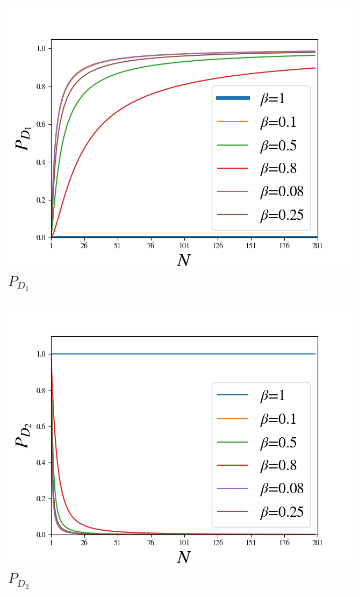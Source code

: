 \documentclass{book}
\begin{document}
 \begin{figure}[!t]
\centering
\begin{subfigure}[b]{0.45\linewidth}
\includegraphics[width=\linewidth]{images/ChopperD1.png}
\caption{$P_{D_{1}}$}
\label{fig:BS1}
\end{subfigure}
\begin{subfigure}[b]{0.45\linewidth}
\includegraphics[width=\linewidth]{images/ChopperD2.png}
\caption{$P_{D_{2}}$}
\label{fig:westminster_aerea}
\end{subfigure}
\begin{subfigure}[b]{0.45\linewidth}

\end{subfigure}
\end{figure}
\end{document}
